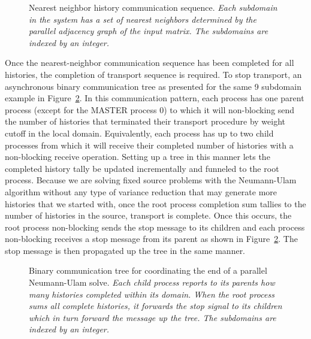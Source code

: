 \documentclass{snamc2013}
\begin{document}
\begin{figure}[h!]
  \begin{center}
    \scalebox{0.7}{  }
  \end{center}
  \caption{Nearest neighbor history communication sequence.
    \textit{Each subdomain in the system has a set of nearest
      neighbors determined by the parallel adjacency graph of the
      input matrix. The subdomains are indexed by an integer.}}
  \label{fig:nearest_neighbor_comm}
\end{figure}

Once the nearest-neighbor communication sequence has been completed
for all histories, the completion of transport sequence is
required. To stop transport, an asynchronous binary communication tree
as presented for the same 9 subdomain example in
Figure~\ref{fig:binary_comm_tree}. In this communication pattern, each
process has one parent process (except for the MASTER process 0) to
which it will non-blocking send the number of histories that
terminated their transport procedure by weight cutoff in the local
domain. Equivalently, each process has up to two child processes from
which it will receive their completed number of histories with a
non-blocking receive operation. Setting up a tree in this manner lets
the completed history tally be updated incrementally and funneled to
the root process. Because we are solving fixed source problems with
the Neumann-Ulam algorithm without any type of variance reduction that
may generate more histories that we started with, once the root
process completion sum tallies to the number of histories in the
source, transport is complete. Once this occurs, the root process
non-blocking sends the stop message to its children and each process
non-blocking receives a stop message from its parent as shown in
Figure~\ref{fig:binary_comm_tree}. The stop message is then propagated
up the tree in the same manner.
\begin{figure}[h!]
  \begin{center}
    \scalebox{0.6}{
       }
  \end{center}
  \caption{Binary communication tree for coordinating the end of a
    parallel Neumann-Ulam solve. \textit{Each child process reports to
      its parents how many histories completed within its domain. When
      the root process sums all complete histories, it forwards the
      stop signal to its children which in turn forward the message up
      the tree. The subdomains are indexed by an integer.}}
  \label{fig:binary_comm_tree}
\end{figure}
\end{document}
